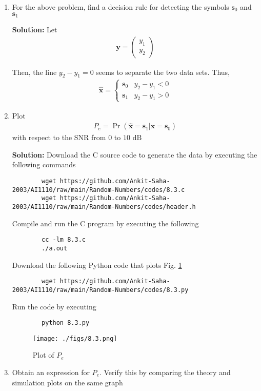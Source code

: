 \documentclass[journal,12pt,twocolumn]{IEEEtran}
\newcommand{\solution}{\noindent \textbf{Solution: }}
\providecommand{\pr}[1]{\ensuremath{\Pr\left(#1\right)}}
\providecommand{\mbf}{\mathbf}
\let\vec\mathbf
\numberwithin{equation}{section}
\renewcommand\thesection{\arabic{section}}
\newcommand{\myvec}[1]{\ensuremath{\begin{pmatrix}#1\end{pmatrix}}}
\begin{document}
\begin{enumerate}[label=\thesection.\arabic*,ref=\thesection.\theenumi]
	\item For the above problem, find a decision rule for detecting the symbols $\mbf{s}_0 $ and $\mbf{s}_1$
	
	\solution Let
	\begin{align}
		\vec{y} = \myvec{y_1 \\ y_2}
	\end{align}
	
	Then, the line $y_2 - y_1 = 0$ seems to separate the two data sets. Thus,
	\begin{align}
		\hat{\vec{x}} = 
		\begin{cases}
			\vec{s}_0 & y_2 - y_1 < 0 \\
			\vec{s}_1 & y_2 - y_1 > 0
		\end{cases}
	\end{align}
	
	\item Plot 
	\begin{align} 
		P_e = \pr{\hat{\vec{x}} = \vec{s}_1|\vec{x} = \vec{s}_0}
	\end{align}
	with respect to the SNR from $0$ to $10$ $\mathrm{dB}$
	
	\solution Download the C source code to generate the data by executing the following commands
	\begin{lstlisting}
		wget https://github.com/Ankit-Saha-2003/AI1110/raw/main/Random-Numbers/codes/8.3.c
		wget https://github.com/Ankit-Saha-2003/AI1110/raw/main/Random-Numbers/codes/header.h
	\end{lstlisting}
	Compile and run the C program by executing the following
	\begin{lstlisting}
		cc -lm 8.3.c
		./a.out
	\end{lstlisting}
	
	Download the following Python code that plots Fig. \ref{fig-8.3} 
	\begin{lstlisting}
		wget https://github.com/Ankit-Saha-2003/AI1110/raw/main/Random-Numbers/codes/8.3.py
	\end{lstlisting}
	Run the code by executing
	\begin{lstlisting}
		python 8.3.py
	\end{lstlisting}
	
	\begin{figure}
		\centering
		\texttt{[image: ./figs/8.3.png]}
		\caption{Plot of $P_e$}
		\label{fig-8.3}
	\end{figure}
	
	\item Obtain an expression for $P_e$. Verify this by comparing the theory and simulation plots on the same graph
	

\end{enumerate}
\end{document}
